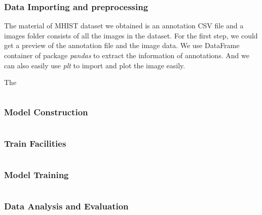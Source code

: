 \documentclass[conference]{IEEEtran}
\begin{document}
\subsubsection{Data Importing and preprocessing}

The material of MHIST dataset we obtained is an annotation CSV file and a images folder consists of all the images in the dataset. For the first step, we could get a preview of the annotation file and the image data. We use DataFrame container of package \textit{pandas} to extract the information of annotations. And we can also easily use \textit{plt} to import and plot the image easily.

The 
\begin{lstlisting}

\end{lstlisting}

\subsubsection{Model Construction}

\begin{lstlisting}

\end{lstlisting}

\subsubsection{Train Facilities}

\begin{lstlisting}

\end{lstlisting}

\subsubsection{Model Training}

\begin{lstlisting}

\end{lstlisting}

\subsubsection{Data Analysis and Evaluation}

\begin{lstlisting}

\end{lstlisting}
\end{document}
